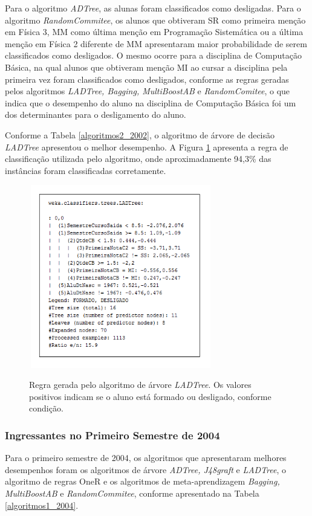 Para o algoritmo \textit{ADTree}, as alunas foram classificados como desligadas. Para o algoritmo \textit{RandomCommitee}, os alunos que obtiveram SR como primeira menção em Física 3, MM como última menção em Programação Sistemática ou a última menção em Física 2 diferente de MM apresentaram maior probabilidade de serem classificados como desligados. O mesmo ocorre para a disciplina de Computação Básica, na qual alunos que obtiveram menção MI ao cursar a disciplina pela primeira vez foram classificados como desligados, conforme as regras geradas pelos algoritmos \textit{LADTree, Bagging, MultiBoostAB} e \textit{RandomComitee}, o que indica que o desempenho do  aluno na disciplina de Computação Básica foi um dos determinantes para o desligamento do aluno. 

Conforme a Tabela \ref{algoritmos2_2002}, o algoritmo de árvore de decisão \textit{LADTree} apresentou o melhor desempenho. A Figura \ref{ladtree2_2002} apresenta a regra de classificação utilizada pelo algoritmo, onde aproximadamente 94,3\% das instâncias foram classificadas corretamente.
 
 \begin{figure}[!h]
 	\centering
 	{\includegraphics[width=8cm, height=8cm]{images/regra2_2002}}
 	\caption {Regra gerada pelo algoritmo de árvore \textit{LADTree}. Os valores positivos indicam se o aluno está formado ou desligado, conforme condição.}
 	\label{ladtree2_2002}
 \end{figure}
 
 
\subsubsection{Ingressantes no Primeiro Semestre de 2004}

Para o primeiro semestre de 2004, os algoritmos que apresentaram melhores desempenhos foram os algoritmos de árvore \textit{ADTree, J48graft} e \textit{LADTree}, o algoritmo de regras {OneR} e os algoritmos de meta-aprendizagem \textit{Bagging, MultiBoostAB} e \textit{RandomCommitee}, conforme apresentado na Tabela \ref{algoritmos1_2004}.

